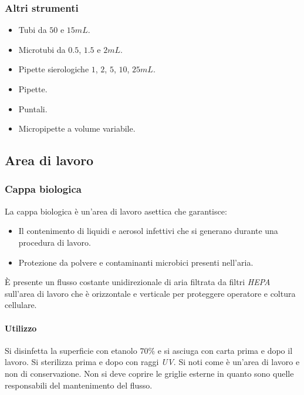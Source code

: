 		\subsubsection{Altri strumenti}
		\begin{multicols}{2}
			\begin{itemize}
				\item Tubi da $50$ e $15\si{mL}$.
				\item Microtubi da $0.5$, $1.5$ e $2\si{mL}$.
				\item Pipette sierologiche $1$, $2$, $5$, $10$, $25\si{mL}$.
				\item Pipette.
				\item Puntali.
				\item Micropipette a volume variabile.
			\end{itemize}
		\end{multicols}
	
	\subsection{Area di lavoro}

		\subsubsection{Cappa biologica}
		La cappa biologica \`e un'area di lavoro asettica che garantisce:
		\begin{multicols}{2}
		\begin{itemize}
			\item Il contenimento di liquidi e aerosol infettivi che si generano durante una procedura di lavoro.
			\item Protezione da polvere e contaminanti microbici presenti nell'aria.
		\end{itemize}
	\end{multicols}
		\`E presente un flusso costante unidirezionale di aria filtrata da filtri \emph{HEPA} sull'area di lavoro che \`e orizzontale e verticale per proteggere operatore e coltura cellulare.
			\paragraph{Utilizzo}
			Si disinfetta la superficie con etanolo $70\%$  e si asciuga con carta prima e dopo il lavoro.
			Si sterilizza prima e dopo con raggi \emph{UV}. 
			Si noti come \`e un'area di lavoro e non di conservazione.
			Non si deve coprire le griglie esterne in quanto sono quelle responsabili del mantenimento del flusso. 

